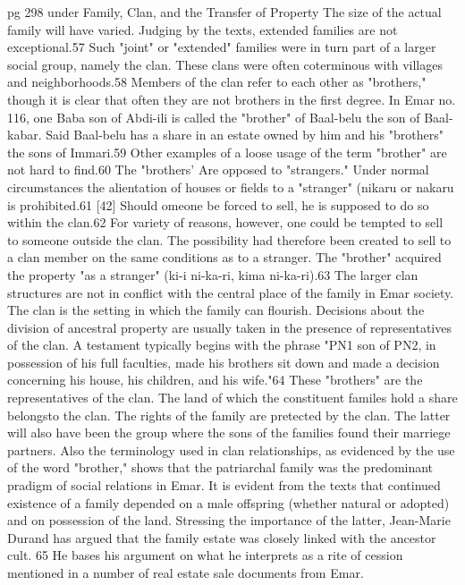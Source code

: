 \documentclass[11pt]{article}
\begin{document}
{pg 298 under Family, Clan, and the Transfer of Property
The size of the actual family will have varied. Judging by the texts, extended families are not exceptional.57 Such "joint" or "extended" families were in turn part of a larger social group, namely the clan. These clans were often coterminous with villages and neighborhoods.58 Members of the clan refer to each other as "brothers," though it is clear that often they are not brothers in the first degree. In Emar no. 116, one Baba son of Abdi-ili is called the "brother" of Baal-belu the son of Baal-kabar. Said Baal-belu has a share in an estate owned by him and his "brothers" the sons of Immari.59 Other examples of a loose usage of the term "brother" are not hard to find.60 The "brothers' Are opposed to "strangers." Under normal circumstances the alientation of houses or fields to a "stranger" (nikaru or nakaru is prohibited.61 [42] Should omeone be forced to sell, he is supposed to do so within the clan.62 For variety of reasons, however, one could be tempted to sell to someone outside the clan. The possibility had therefore been created to sell to a clan member on the same conditions as to a stranger. The "brother" acquired the property "as a stranger" (ki-i ni-ka-ri, kima ni-ka-ri).63
The larger clan structures are not in conflict with the central place of the family in Emar society. The clan is the setting in which the family can flourish. Decisions about the division of ancestral property are usually taken in the presence of representatives of the clan. A testament typically begins with the phrase "PN1 son of PN2, in possession of his full faculties, made his brothers sit down and made a decision concerning his house, his children, and his wife."64 These "brothers" are the representatives of the clan. The land of which the constituent familes hold a share belongsto the clan. The rights of the family are pretected by the clan. The latter will also have been the group where the sons of the families found their marriege partners. Also the terminology used in clan relationships, as evidenced by the use of the word "brother," shows that the patriarchal family was the predominant pradigm of social relations in Emar.
It is evident from the texts that continued existence of a family depended on a male offspring (whether natural or adopted) and on possession of the land. Stressing the importance of the latter, Jean-Marie Durand has argued that the family estate was closely linked with the ancestor cult. 65 He bases his argument on what he interprets as a rite of cession mentioned in a number of real estate sale documents from Emar. 
\fi


}
\end{document}

